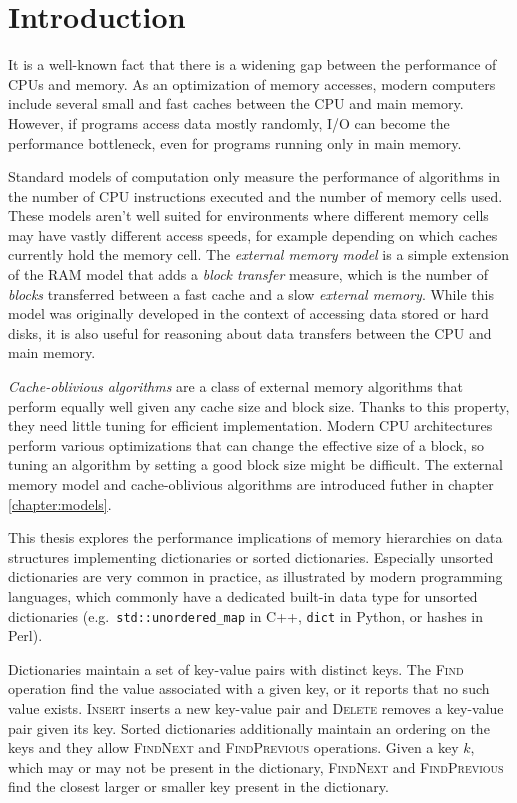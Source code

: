 \chapter*{Introduction}

It is a well-known fact that there is a widening gap between
the performance of CPUs and memory. As an optimization of memory accesses,
modern computers include several small and fast caches between the CPU and
main memory. However, if programs access data mostly randomly, I/O can become
the performance bottleneck, even for programs running only in main memory.

Standard models of computation only measure the performance of algorithms
in the number of CPU instructions executed and the number of memory cells used.
These models aren't well suited for environments where different memory cells
may have vastly different access speeds, for example depending on which caches
currently hold the memory cell. The \emph{external memory model} is a simple
extension of the RAM model that adds a \emph{block transfer} measure, which
is the number of \emph{blocks} transferred between a fast cache and a slow
\emph{external memory}. While this model was originally developed
in the context of accessing data stored or hard disks, it is also useful
for reasoning about data transfers between the CPU and main memory.

\emph{Cache-oblivious algorithms} are a class of external memory algorithms
that perform equally well given any cache size and block size. Thanks to this
property, they need little tuning for efficient implementation.
Modern CPU architectures perform various optimizations that can change
the effective size of a block, so tuning an algorithm by setting a good block
size might be difficult.
The external memory model and cache-oblivious algorithms are introduced futher
in chapter \ref{chapter:models}.

This thesis explores the performance implications of memory hierarchies
on data structures implementing dictionaries or sorted dictionaries.
Especially unsorted dictionaries are very common in practice, as illustrated
by modern programming languages, which commonly have a dedicated built-in
data type for unsorted dictionaries (e.g.\ \texttt{std::unordered\_map} in C++,
\texttt{dict} in Python, or hashes in Perl).

Dictionaries maintain a set of key-value pairs with distinct keys.
The \textsc{Find} operation find the value associated with a given key, or
it reports that no such value exists. \textsc{Insert} inserts a new
key-value pair and \textsc{Delete} removes a key-value pair given its key.
Sorted dictionaries additionally maintain an ordering on the keys and they
allow \textsc{FindNext} and \textsc{FindPrevious} operations.
Given a key $k$, which may or may not be present in the dictionary,
\textsc{FindNext} and \textsc{FindPrevious} find the closest larger or smaller
key present in the dictionary.

